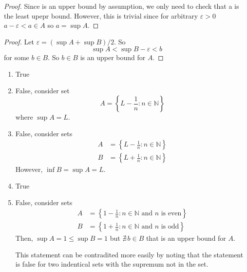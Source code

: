 \begin{proof}
    Since is an upper bound by assumption, we only need to check that
    a is the least upepr bound. However, this is trivial since for arbitrary $\varepsilon > 0$ $a - \varepsilon < a \in A$ so $a = \sup A$.
\end{proof}

\begin{proof}
    Let $\varepsilon = (\sup A + \sup B) / 2$. So
    \begin{equation*}
        \sup A < \sup B - \varepsilon < b
    \end{equation*}
    for some $b \in B$. So $b \in  B$ is an upper bound for $A$. 
\end{proof}

\begin{enumerate}[label=(\alph*)]
    \item True
    
    \item 
    False, consider set 
    \begin{equation*}
        A = \left\{ L - \frac{1}{n} : n \in \mathbb{N} \right\}
    \end{equation*}
    where $\sup A = L$.
    
    \item 
    False, consider sets
    \begin{align*}
        A &= \left\{ L - \frac{1}{n} : n \in \mathbb{N} \right\} \\
        B &= \left\{ L + \frac{1}{n} : n \in \mathbb{N} \right\}
    \end{align*}
    However, $\inf B = \sup A = L$.

    \item True

    \item 
    False, consider sets
    \begin{align*}
        A &= \left\{ 1 - \frac{1}{n} : n \in \mathbb{N} \text{ and } n \text{ is even} \right\} \\
        B &= \left\{ 1 + \frac{1}{n} : n \in \mathbb{N} \text{ and } n \text{ is odd} \right\}
    \end{align*}
    Then, $\sup A = 1 \leq \sup B = 1$ but $\nexists \, b \in B$ that is an upper bound for $A$.

    This statement can be contradited more easily by noting that the 
    statement is false for two indentical sets with the supremum not in 
    the set.
\end{enumerate}
    
